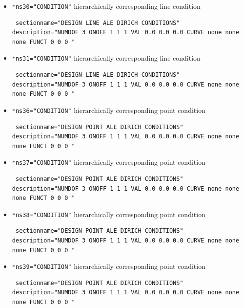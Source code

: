 \begin{itemize}
 \item \verb|*ns30="CONDITION"| \qquad hierarchically corresponding line condition
\begin{small} \begin{verbatim} sectionname="DESIGN LINE ALE DIRICH CONDITIONS"
description="NUMDOF 3 ONOFF 1 1 1 VAL 0.0 0.0 0.0 CURVE none none none FUNCT 0 0 0 "
\end{verbatim} \end{small}

\item \verb|*ns31="CONDITION"| \qquad hierarchically corresponding line condition
\begin{small} \begin{verbatim} sectionname="DESIGN LINE ALE DIRICH CONDITIONS"
description="NUMDOF 3 ONOFF 1 1 1 VAL 0.0 0.0 0.0 CURVE none none none FUNCT 0 0 0 "
\end{verbatim} \end{small}

 \item \verb|*ns36="CONDITION"| \qquad hierarchically corresponding point condition
\begin{small} \begin{verbatim} sectionname="DESIGN POINT ALE DIRICH CONDITIONS"
description="NUMDOF 3 ONOFF 1 1 1 VAL 0.0 0.0 0.0 CURVE none none none FUNCT 0 0 0 "
\end{verbatim} \end{small}

 \item \verb|*ns37="CONDITION"| \qquad hierarchically corresponding point condition
\begin{small} \begin{verbatim} sectionname="DESIGN POINT ALE DIRICH CONDITIONS"
description="NUMDOF 3 ONOFF 1 1 1 VAL 0.0 0.0 0.0 CURVE none none none FUNCT 0 0 0 "
\end{verbatim} \end{small}

 \item \verb|*ns38="CONDITION"| \qquad hierarchically corresponding point condition
\begin{small} \begin{verbatim} sectionname="DESIGN POINT ALE DIRICH CONDITIONS"
description="NUMDOF 3 ONOFF 1 1 1 VAL 0.0 0.0 0.0 CURVE none none none FUNCT 0 0 0 "
\end{verbatim} \end{small}

\item \verb|*ns39="CONDITION"| \qquad hierarchically corresponding point condition
\begin{small} \begin{verbatim} sectionname="DESIGN POINT ALE DIRICH CONDITIONS"
description="NUMDOF 3 ONOFF 1 1 1 VAL 0.0 0.0 0.0 CURVE none none none FUNCT 0 0 0 "
\end{verbatim} \end{small}

\end{itemize}

